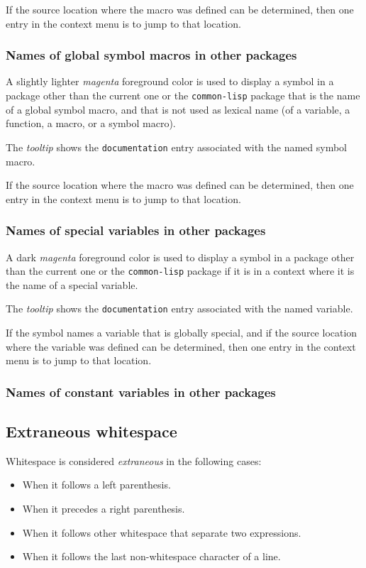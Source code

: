If the source location where the macro was defined can be determined,
then one entry in the context menu is to jump to that location.

\subsubsection{Names of global symbol macros in other packages}

A slightly lighter \emph{magenta} foreground color is used to display
a symbol in a package other than the current one or the
\texttt{common-lisp} package that is the name of a global symbol
macro, and that is not used as lexical name (of a variable, a
function, a macro, or a symbol macro).

The \emph{tooltip} shows the \texttt{documentation} entry associated
with the named symbol macro.

If the source location where the macro was defined can be determined,
then one entry in the context menu is to jump to that location.

\subsubsection{Names of special variables in other packages}

A dark \emph{magenta} foreground color is used to display a symbol in
a package other than the current one or the \texttt{common-lisp}
package if it is in a context where it is the name of a special
variable.

The \emph{tooltip} shows the \texttt{documentation} entry associated
with the named variable.

If the symbol names a variable that is globally special, and if
the source location where the variable was defined can be
determined, then one entry in the context menu is to jump to that
location.

\subsubsection{Names of constant variables in other packages}

\subsection{Extraneous whitespace}

Whitespace is considered \emph{extraneous} in the following cases: 

\begin{itemize}
\item When it follows a left parenthesis.
\item When it precedes a right parenthesis.
\item When it follows other whitespace that separate two expressions. 
\item When it follows the last non-whitespace character of a line.
\end{itemize}

